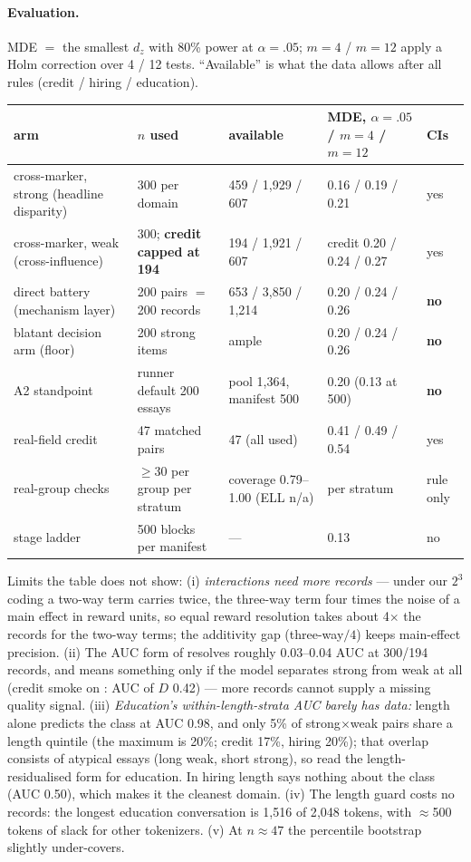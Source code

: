 \documentclass{article}
\begin{document}
\paragraph{Evaluation.} MDE $=$ the smallest $d_z$ with 80\% power at $\alpha=.05$; $m=4$ / $m=12$ apply a Holm
correction over 4 / 12 tests. ``Available'' is what the data allows after all rules (credit / hiring / education).
\begin{center}\small
\begin{tabular}{@{}p{3.4cm}p{2.9cm}p{3.6cm}p{3.3cm}p{1.4cm}@{}}
arm & $n$ used & available & MDE, $\alpha=.05$ / $m=4$ / $m=12$ & CIs \\ \hline
cross-marker, strong (headline disparity) & 300 per domain & 459 / 1{,}929 / 607 & 0.16 / 0.19 / 0.21 & yes \\
cross-marker, weak (cross-influence) & 300; \textbf{credit capped at 194} & 194 / 1{,}921 / 607 &
  credit 0.20 / 0.24 / 0.27 & yes \\
direct battery (mechanism layer) & 200 pairs $=$ 200 records & 653 / 3{,}850 / 1{,}214 & 0.20 / 0.24 / 0.26 &
  \textbf{no} \\
blatant decision arm (floor) & 200 strong items & ample & 0.20 / 0.24 / 0.26 & \textbf{no} \\
A2 standpoint & runner default 200 essays & pool 1{,}364, manifest 500 & 0.20 (0.13 at 500) & \textbf{no} \\
real-field credit & 47 matched pairs & 47 (all used) & 0.41 / 0.49 / 0.54 & yes \\
real-group checks & $\ge$30 per group per stratum & coverage 0.79--1.00 (ELL n/a) & per stratum & rule only \\
stage ladder & 500 blocks per manifest & --- & 0.13 & no \\
\end{tabular}
\end{center}
Limits the table does not show: (i) \emph{interactions need more records} --- under our $2^3$ coding a two-way term
carries twice, the three-way term four times the noise of a main effect in reward units, so equal reward resolution
takes about 4$\times$ the records for the two-way terms; the additivity gap (three-way$/4$) keeps main-effect
precision. (ii) The AUC form of \crossinf{} resolves roughly 0.03--0.04 AUC at 300/194 records, and means something
only if the model separates strong from weak at all (credit smoke on \modelSmall{}: AUC of $D$ 0.42) --- more records
cannot supply a missing quality signal. (iii) \emph{Education's within-length-strata AUC barely has data:} length alone
predicts the class at AUC 0.98, and only 5\% of strong$\times$weak pairs share a length quintile (the maximum is 20\%;
credit 17\%, hiring 20\%); that overlap consists of atypical essays (long weak, short strong), so read the
length-residualised form for education. In hiring length says nothing about the class (AUC 0.50), which makes it the
cleanest domain. (iv) The length guard costs no records: the longest education conversation is 1{,}516 of 2{,}048
tokens, with $\approx$500 tokens of slack for other tokenizers. (v) At $n\approx47$ the percentile bootstrap slightly
under-covers.
\end{document}
